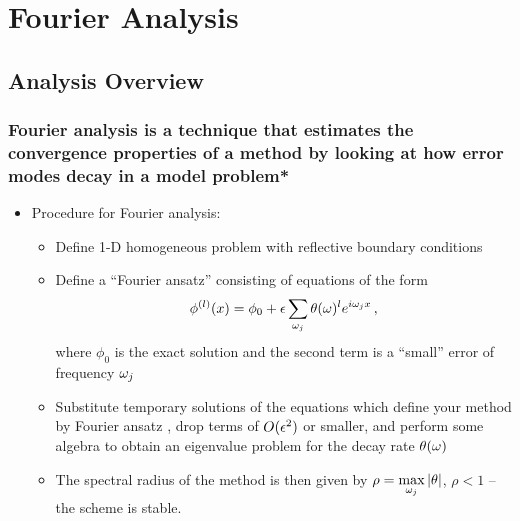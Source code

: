 \section{Fourier Analysis}
\subsection{Analysis Overview}
\begin{frame}
	\frametitle{Fourier analysis is a technique that estimates the convergence properties of a method by looking at how error modes decay in a model problem*}
	\begin{itemize}
		\item Procedure for Fourier analysis:
		\begin{itemize}
		    \item Define 1-D homogeneous problem with reflective boundary conditions
			\item Define a ``Fourier ansatz'' consisting of equations of the form
				\begin{equation}
					\phi^{(l)}(x) = \phi_{0} + \epsilon\sum_{\omega_j} \theta(\omega)^l  e^{i \omega_j x} \,,
				\end{equation}
        		where $\phi_{0}$ is the exact solution and the second term is a ``small'' error of frequency $\omega_j$
			\item Substitute temporary solutions of the equations  which define your method by Fourier ansatz , drop terms of $O(\epsilon^2)$ or smaller, and perform some algebra to obtain an eigenvalue problem for the decay rate $\theta(\omega)$
			\item The spectral radius of the method is then given by $\rho = \max\limits_{\omega_j}|\theta|$, $\rho<1$ -- the scheme is stable.
		\end{itemize}%
	\end{itemize}
\end{frame}
